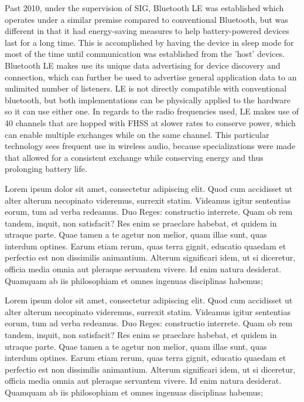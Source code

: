 \documentclass[conference]{IEEEtran}
\begin{document}
Past 2010, under the supervision of SIG, Bluetooth LE was established which operates under a
similar premise compared to conventional Bluetooth, but was different in that it had
energy-saving measures to help battery-powered devices last for a long time. This is
accomplished by having the device in sleep mode for most of the time until communication was
established from the 'host' devices.\cite{bhalla_unraveling_2021} Bluetooth LE makes use its
unique data advertising for device discovery and connection, which can further be used to
advertise general application data to an unlimited number of listeners. LE is not directly
compatible with conventional bluetooth, but both implementations can be physically applied to
the hardware so it can use either one.\cite{bhalla_unraveling_2021} In regards to the radio
frequencies used, LE makes use of 40 channels that are hopped with FHSS at slower rates to
conserve power, which can enable multiple exchanges while on the same channel.
\cite{noauthor_bluetooth_nodate} This particular technology sees frequent use in wireless
audio, because specializations were made that allowed for a consistent exchange while
conserving energy and thus prolonging battery life.\cite{bhalla_unraveling_2021}

Lorem ipsum dolor sit amet, consectetur adipiscing elit. Quod cum accidisset ut alter alterum
necopinato videremus, surrexit statim. Videamus igitur sententias eorum, tum ad verba
redeamus. Duo Reges: constructio interrete. Quam ob rem tandem, inquit, non satisfacit? Res
enim se praeclare habebat, et quidem in utraque parte. Quae tamen a te agetur non melior,
quam illae sunt, quas interdum optines. Earum etiam rerum, quas terra gignit, educatio
quaedam et perfectio est non dissimilis animantium. Alterum significari idem, ut si
diceretur, officia media omnia aut pleraque servantem vivere. Id enim natura desiderat.
Quamquam ab iis philosophiam et omnes ingenuas disciplinas habemus;

Lorem ipsum dolor sit amet, consectetur adipiscing elit. Quod cum accidisset ut alter alterum
necopinato videremus, surrexit statim. Videamus igitur sententias eorum, tum ad verba
redeamus. Duo Reges: constructio interrete. Quam ob rem tandem, inquit, non satisfacit? Res
enim se praeclare habebat, et quidem in utraque parte. Quae tamen a te agetur non melior,
quam illae sunt, quas interdum optines. Earum etiam rerum, quas terra gignit, educatio
quaedam et perfectio est non dissimilis animantium. Alterum significari idem, ut si
diceretur, officia media omnia aut pleraque servantem vivere. Id enim natura desiderat.
Quamquam ab iis philosophiam et omnes ingenuas disciplinas habemus;
\end{document}
